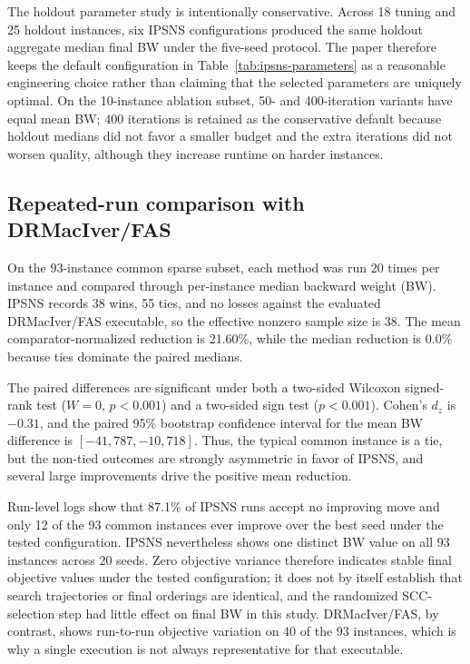 The holdout parameter study is intentionally conservative. Across 18 tuning and 25 holdout instances, six IPSNS configurations produced the same holdout aggregate median final BW under the five-seed protocol. The paper therefore keeps the default configuration in Table~\ref{tab:ipsns-parameters} as a reasonable engineering choice rather than claiming that the selected parameters are uniquely optimal. On the 10-instance ablation subset, 50- and 400-iteration variants have equal mean BW; 400 iterations is retained as the conservative default because holdout medians did not favor a smaller budget and the extra iterations did not worsen quality, although they increase runtime on harder instances.

\subsection{Repeated-run comparison with DRMacIver/FAS}
\label{subsec:exp10-results}

On the 93-instance common sparse subset, each method was run 20 times per instance and compared through per-instance median backward weight (BW). IPSNS records 38 wins, 55 ties, and no losses against the evaluated DRMacIver/FAS executable, so the effective nonzero sample size is 38. The mean comparator-normalized reduction is 21.60\%, while the median reduction is 0.0\% because ties dominate the paired medians.

The paired differences are significant under both a two-sided Wilcoxon signed-rank test (\(W=0\), \(p<0.001\)) and a two-sided sign test (\(p<0.001\)). Cohen's \(d_z\) is \(-0.31\), and the paired 95\% bootstrap confidence interval for the mean BW difference is \([-41{,}787,-10{,}718]\). Thus, the typical common instance is a tie, but the non-tied outcomes are strongly asymmetric in favor of IPSNS, and several large improvements drive the positive mean reduction.

Run-level logs show that 87.1\% of IPSNS runs accept no improving move and only 12 of the 93 common instances ever improve over the best seed under the tested configuration. IPSNS nevertheless shows one distinct BW value on all 93 instances across 20 seeds. Zero objective variance therefore indicates stable final objective values under the tested configuration; it does not by itself establish that search trajectories or final orderings are identical, and the randomized SCC-selection step had little effect on final BW in this study. DRMacIver/FAS, by contrast, shows run-to-run objective variation on 40 of the 93 instances, which is why a single execution is not always representative for that executable.

